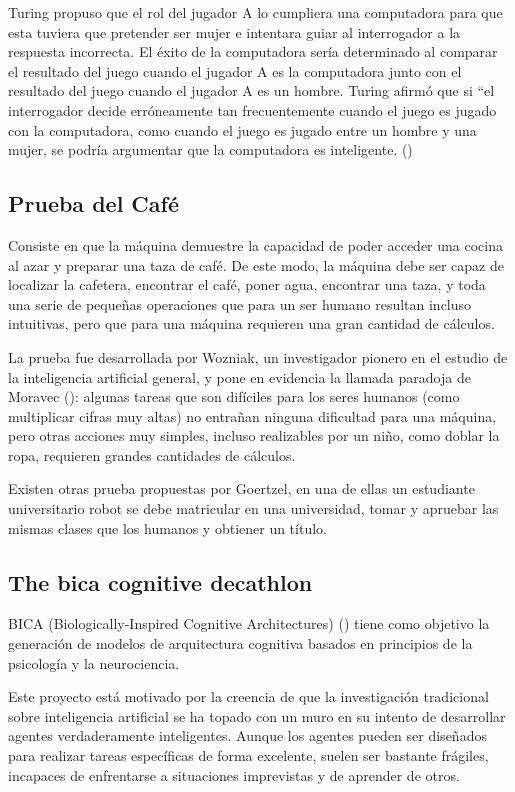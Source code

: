 Turing propuso que el rol del jugador A lo cumpliera una computadora para que esta tuviera que pretender ser mujer e intentara guiar al interrogador a la respuesta incorrecta. El éxito de la computadora sería determinado al comparar el resultado del juego cuando el jugador A es la computadora junto con el resultado del juego cuando el jugador A es un hombre. Turing afirmó que si “el interrogador decide erróneamente tan frecuentemente cuando el juego es jugado con la computadora, como cuando el juego es jugado entre un hombre y una mujer, se podría argumentar que la computadora es inteligente. (\cite{pinar2000turing})

\subsection{Prueba del Café}

Consiste en que la máquina demuestre la capacidad de poder acceder una cocina al azar y preparar una taza de café. De este modo, la máquina debe ser capaz de localizar la cafetera, encontrar el café, poner agua, encontrar una taza, y toda una serie de pequeñas operaciones que para un ser humano resultan incluso intuitivas, pero que para una máquina requieren una gran cantidad de cálculos.

La prueba fue desarrollada por Wozniak, un investigador pionero en el estudio de la inteligencia artificial general, y pone en evidencia la llamada paradoja de Moravec (\cite{rotenberg2013moravec}): algunas tareas que son difíciles para los seres humanos (como multiplicar cifras muy altas) no entrañan ninguna dificultad para una máquina, pero otras acciones muy simples, incluso realizables por un niño, como doblar la ropa, requieren grandes cantidades de cálculos.

Existen otras prueba propuestas por Goertzel, en una de ellas un estudiante universitario robot se debe matricular en una universidad, tomar y apruebar las mismas clases que los humanos y obtiener un título.

\subsection{The bica cognitive decathlon}

BICA (Biologically-Inspired Cognitive Architectures) (\cite{mueller2007bica}) tiene como objetivo la generación de modelos de arquitectura cognitiva basados en principios de la psicología y la neurociencia. 

Este proyecto está motivado por la creencia de que la investigación tradicional sobre inteligencia artificial se ha topado con un muro en su intento de desarrollar agentes verdaderamente inteligentes. Aunque los agentes pueden ser diseñados para realizar tareas específicas de forma excelente, suelen ser bastante frágiles, incapaces de enfrentarse a situaciones imprevistas y de aprender de otros. 

